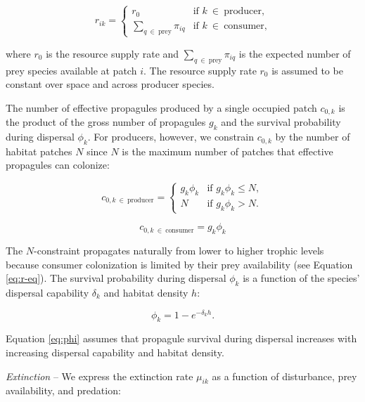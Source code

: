 \documentclass[11pt, class=article, crop=false]{standalone}
\begin{document}
\begin{equation}
    r_{ik} =
    \begin{cases}
    r_{0} & \text{if $k~\in~\text{producer}$,}\\
    \sum_{q~\in~\text{prey}} \pi_{iq} & \text{if $k~\in~\text{consumer}$,}
    \end{cases}
    \label{eq:r-eq}
\end{equation}

where $r_0$ is the resource supply rate and $\sum_{q~\in~\text{prey}} \pi_{iq}$ is the expected number of prey species available at patch $i$.
The resource supply rate $r_0$ is assumed to be constant over space and across producer species.

The number of effective propagules produced by a single occupied patch $c_{0, k}$ is the product of the gross number of propagules $g_{k}$ and the survival probability during dispersal $\phi_k$.
For producers, however, we constrain $c_{0, k}$ by the number of habitat patches $N$ since $N$ is the maximum number of patches that effective propagules can colonize:

\begin{equation}
    c_{0, k~\in~\text{producer}} = 
    \begin{cases}
        g_k \phi_k & \text{if $g_k \phi_k \le N$},\\
        N & \text{if $g_k \phi_k > N$}.
    \end{cases}
    \label{eq:c0-prod}
\end{equation}


\begin{equation}
    c_{0, k~\in~\text{consumer}} = g_k \phi_k
    \label{eq:c0-con}
\end{equation}

The $N$-constraint propagates naturally from lower to higher trophic levels because consumer colonization is limited by their prey availability (see Equation \ref{eq:r-eq}).
The survival probability during dispersal $\phi_k$ is a function of the species' dispersal capability $\delta_k$ and habitat density $h$:

\begin{equation}
    \phi_k = 1 - e^{-\delta_k h}.
    \label{eq:phi}
\end{equation}

Equation \ref{eq:phi} assumes that propagule survival during dispersal increases with increasing dispersal capability and habitat density.

\textit{Extinction} -- 
We express the extinction rate $\mu_{ik}$ as a function of disturbance, prey availability, and predation:
\end{document}
